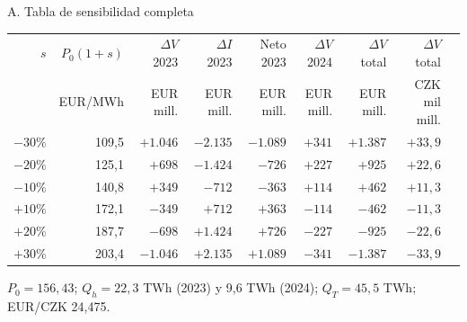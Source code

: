 \documentclass[aspectratio=169,11pt]{beamer}
\newcommand{\fuente}[1]{\vfill{\raggedright\tiny\color{cezgray}Fuente: #1\par}}
\begin{document}
\appendix

\begin{frame}[t]{A. Tabla de sensibilidad completa}
  \centering
  \scriptsize
  \renewcommand{\arraystretch}{1.2}
  \setlength{\tabcolsep}{3.5pt}
  \begin{tabular}{@{}r r r r r r r r r@{}}
    \toprule
    $s$ & $P_0(1+s)$ & $\Delta V$ 2023 & $\Delta I$ 2023 & Neto 2023 & $\Delta V$ 2024 & $\Delta V$ total & $\Delta V$ total \\
    & EUR/MWh & EUR mill. & EUR mill. & EUR mill. & EUR mill. & EUR mill. & CZK mil mill. \\ \midrule
    $-30\%$ & 109,5 & $+1.046$ & $-2.135$ & $-1.089$ & $+341$ & $+1.387$ & $+33,9$ \\
    $-20\%$ & 125,1 & $+698$ & $-1.424$ & $-726$ & $+227$ & $+925$ & $+22,6$ \\
    $-10\%$ & 140,8 & $+349$ & $-712$ & $-363$ & $+114$ & $+462$ & $+11,3$ \\
    $+10\%$ & 172,1 & $-349$ & $+712$ & $+363$ & $-114$ & $-462$ & $-11,3$ \\
    $+20\%$ & 187,7 & $-698$ & $+1.424$ & $+726$ & $-227$ & $-925$ & $-22,6$ \\
    $+30\%$ & 203,4 & $-1.046$ & $+2.135$ & $+1.089$ & $-341$ & $-1.387$ & $-33,9$ \\
    \bottomrule
  \end{tabular}
  \vspace{3mm}

  \begin{minipage}{0.95\textwidth}\raggedright\scriptsize
  $P_0=156{,}43$; $Q_h=22{,}3$ TWh (2023) y 9,6 TWh (2024); $Q_T=45{,}5$ TWh; EUR/CZK 24,475. 
  \end{minipage}
\end{frame}
\end{document}
